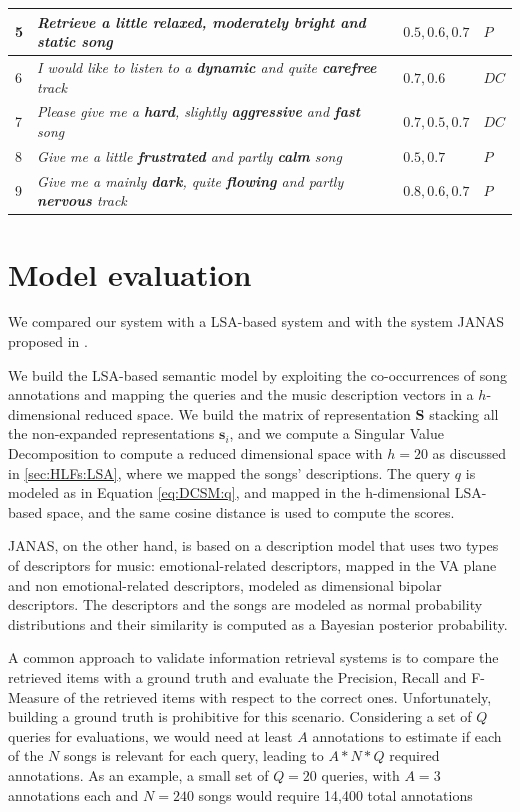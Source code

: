 \begin{table}[tbp]
\begin{tabular}{||l|p{}|p{}|p{}||}
\hline
5 & \textit{Retrieve a little \textbf{relaxed}, moderately \textbf{bright} and \textbf{static} song} & $0.5, 0.6, 0.7$ & $ P$ \\
\hline
6 & \textit{I would like to listen to a \textbf{dynamic} and quite \textbf{carefree} track} & $0.7, 0.6$ & $ DC $ \\
\hline
7 & \textit{Please give me a \textbf{hard}, slightly \textbf{aggressive} and \textbf{fast} song} & $0.7, 0.5, 0.7$ & $ DC $ \\
\hline
8 & \textit{Give me a little \textbf{frustrated} and partly \textbf{calm} song} & 
$0.5, 0.7$ & $P$ \\
\hline
9 & \textit{Give me a mainly \textbf{dark}, quite \textbf{flowing} and partly \textbf{nervous} track}  & $0.8, 0.6, 0.7$ & $P $ \\
\hline 
\hline
\end{tabular}
\egroup
\end{table}

\section{Model evaluation}
We compared our system with a LSA-based system \cite{Deerwester1990} and with the system JANAS proposed in \cite{Buccoli2013}. 

We build the LSA-based semantic model by exploiting the co-occurrences of song annotations and mapping the queries and the music description vectors in a $h$-dimensional reduced space. We build the matrix of representation $\mathbf{S}$ stacking all the non-expanded representations $\mathbf{s}_i$, and we compute a Singular Value Decomposition to compute a reduced dimensional space with $h=20$ as discussed in \ref{sec:HLFs:LSA}, where we mapped the songs' descriptions. The query $q$ is modeled as in Equation \ref{eq:DCSM:q}, and mapped in the h-dimensional LSA-based space, and the same cosine distance is used to compute the scores. 

JANAS, on the other hand, is based on a description model that uses two types of descriptors for music: emotional-related descriptors, mapped in the VA plane \cite{Russell1980} and non emotional-related descriptors, modeled as dimensional bipolar descriptors. The descriptors and the songs are modeled as normal probability distributions and their similarity is computed as a Bayesian posterior probability.

A common approach to validate information retrieval systems is to compare the retrieved items with a ground truth and evaluate the Precision, Recall and F-Measure of the retrieved items with respect to the correct ones. Unfortunately, building a ground truth is prohibitive for this scenario. %
Considering a set of $Q$ queries for evaluations, we would need at least $A$ annotations to estimate if each of the $N$ songs is relevant for each query, leading to $A*N*Q$ required annotations. As an example, a small set of $Q=20$ queries, with $A=3$ annotations each and $N=240$ songs would require 14,400 total annotations

